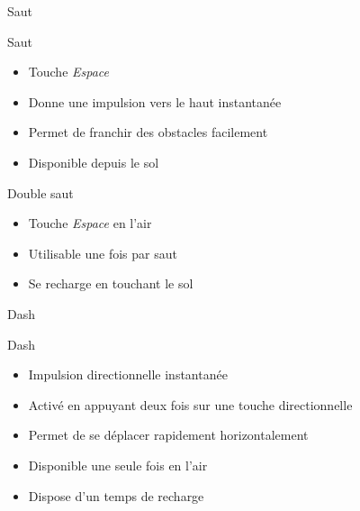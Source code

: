 \documentclass{beamer}
\begin{document}
{\begin{frame}{Saut}
    \begin{block}{Saut}
        \begin{itemize}
            \item[\bullet] Touche \emph{Espace}
            \item[\bullet] Donne une impulsion vers le haut instantanée
            \item[\bullet] Permet de franchir des obstacles facilement
            \item[\bullet] Disponible depuis le sol
        \end{itemize}
    \end{block}
    \begin{block}{Double saut}
        \begin{itemize}
            \item[\bullet] Touche \emph{Espace} en l'air
            \item[\bullet] Utilisable une fois par saut
            \item[\bullet] Se recharge en touchant le sol

        \end{itemize}
    \end{block}
\end{frame}

\begin{frame}{Dash}
    \begin{block}{Dash}
        \begin{itemize}
            \item[\bullet] Impulsion directionnelle instantanée
            \item[\bullet] Activé en appuyant deux fois sur une touche directionnelle
            \item[\bullet] Permet de se déplacer rapidement horizontalement
            \item[\bullet] Disponible une seule fois en l'air
            \item[\bullet] Dispose d'un temps de recharge
        \end{itemize}
    \end{block}
\end{frame}

}
\end{document}
